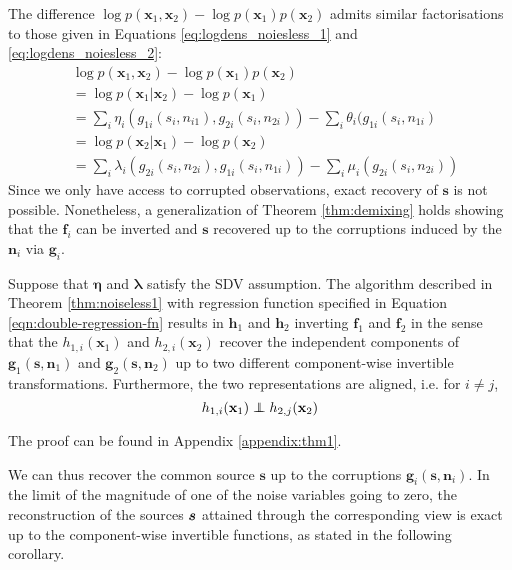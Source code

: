The difference $\log p(\bm{x}_1, \bm{x}_2) - \log p(\bm{x}_1)p(\bm{x}_2)$ admits similar factorisations to those given in Equations \ref{eq:logdens_noiesless_1} and \ref{eq:logdens_noiesless_2}:
\begin{align}
&\log p(\bm{x}_1, \bm{x}_2) - \log p(\bm{x}_1) p(\bm{x}_2) \nonumber\\
&= \log p(\bm{x}_1 | \bm{x}_2) - \log p(\bm{x}_1)\nonumber\\
&= \sum_i \eta_i(g_{1i}(s_i, n_{i1}), g_{2i}(s_i, n_{2i})) - \sum_i \theta_i(g_{1i}(s_i, n_{1i}) \label{eq:noisylogdens_1}\\
&= \log p(\bm{x}_2 | \bm{x}_1) - \log p(\bm{x}_2) \nonumber\\
&= \sum_i \lambda_i(g_{2i}(s_i, n_{2i}), g_{1i}(s_i, n_{1i})) - \sum_i \mu_i(g_{2i}(s_i, n_{2i})) \label{eq:noisylogdens_2}
\end{align}
Since we only have access to corrupted observations, exact recovery of $\bm{s}$ is not possible.
Nonetheless, a generalization of Theorem \ref{thm:demixing} holds showing that the $\bm{f}_i$ can be inverted and $\bm{s}$ recovered up to the corruptions induced by the $\bm{n}_i$ via $\bm{g}_i$.

\medskip

\begin{theorem}\label{thm:two-noisy-views}
	Suppose that $\bm{\eta}$ and $\bm{\lambda}$ satisfy the SDV assumption.
	The algorithm described in Theorem \ref{thm:noiseless1} with regression function specified in Equation \ref{eqn:double-regression-fn} results in $\bm{h}_1$ and $\bm{h}_2$ inverting $\bm{f}_1$ and $\bm{f}_2$ in the sense that the $h_{1,i}(\bm{x}_1)$ and $h_{2,i}(\bm{x}_2)$ recover the independent components of $\bm{g}_1(\bm{s}, \bm{n}_1)$ and $\bm{g}_2(\bm{s}, \bm{n}_2)$ up to two different component-wise invertible transformations. Furthermore, the two representations are aligned, i.e. for $i\not=j$,
	\begin{equation*}
	h_{1,i}(\mathbf{x}_{1})\independent h_{2,j}(\mathbf{x}_{2})
	\end{equation*}
\end{theorem}
The proof can be found in Appendix \ref{appendix:thm1}.




We can thus recover the common source $\bm{s}$ up to the corruptions $\bm{g}_i(\bm{s}, \bm{n}_i)$.
In the limit of the magnitude of one of the noise variables going to zero, the reconstruction of the sources ${\bm{s}}$ attained through the corresponding view is exact up to the component-wise invertible functions, as stated in the following corollary.

